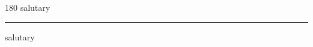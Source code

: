 
\begin{frame}
\begin{center}
\begin{turn}{180}
{\fontsize{2.5cm}{1em}\selectfont salutary}
\end{turn}
\vspace{1em}\par  
\hrule
\vspace{1em}\par  
{\fontsize{2.5cm}{1em}\selectfont salutary}
\end{center}
\end{frame}
